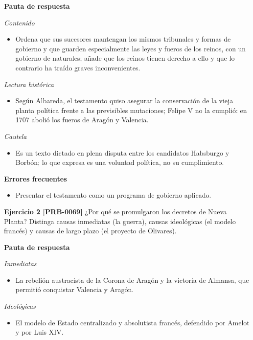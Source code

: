 \documentclass{book}
\begin{document}
\noindent\textbf{Pauta de respuesta}

\noindent\textit{Contenido}
\begin{itemize}
\item Ordena que sus sucesores mantengan los mismos tribunales y formas de gobierno y que guarden especialmente las leyes y fueros de los reinos, con un gobierno de naturales; añade que los reinos tienen derecho a ello y que lo contrario ha traído graves inconvenientes.
\end{itemize}

\noindent\textit{Lectura histórica}
\begin{itemize}
\item Según Albareda, el testamento quiso asegurar la conservación de la vieja planta política frente a las previsibles mutaciones; Felipe V no la cumplió: en 1707 abolió los fueros de Aragón y Valencia.
\end{itemize}

\noindent\textit{Cautela}
\begin{itemize}
\item Es un texto dictado en plena disputa entre los candidatos Habsburgo y Borbón; lo que expresa es una voluntad política, no su cumplimiento.
\end{itemize}

\noindent\textbf{Errores frecuentes}
\begin{itemize}
\item Presentar el testamento como un programa de gobierno aplicado.
\end{itemize}

\noindent\textbf{Ejercicio 2 [PRB-0069]}
¿Por qué se promulgaron los decretos de Nueva Planta? Distinga causas inmediatas (la guerra), causas ideológicas (el modelo francés) y causas de largo plazo (el proyecto de Olivares).


\noindent\textbf{Pauta de respuesta}

\noindent\textit{Inmediatas}
\begin{itemize}
\item La rebelión austracista de la Corona de Aragón y la victoria de Almansa, que permitió conquistar Valencia y Aragón.
\end{itemize}

\noindent\textit{Ideológicas}
\begin{itemize}
\item El modelo de Estado centralizado y absolutista francés, defendido por Amelot y por Luis XIV.
\end{itemize}
\end{document}
